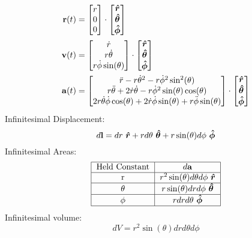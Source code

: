     \begin{align*}
        \vb{r}(t)&=
        \begin{bmatrix}
        r
        \\
        0
        \\
        0
        \end{bmatrix}
        \cdot
        \begin{bmatrix}
        \e{r}
        \\
        \e{\theta}
        \\
        \e{\phi}
        \end{bmatrix}
        \\
        \vb{v}(t)&=
        \begin{bmatrix}
        \dot{r}
        \\
        r\dot{\theta}
        \\
        r\dot{\phi}\sin(\theta)
        \end{bmatrix}
        \cdot
        \begin{bmatrix}
        \e{r}
        \\
        \e{\theta}
        \\
        \e{\phi}
        \end{bmatrix}
        \\
        \vb{a}(t)&=
        \begin{bmatrix}
        \Ddot{r}-r\dot{\theta}^2-r\dot{\phi}^2\sin^2(\theta)
        \\
        r\Ddot{\theta}+2\dot{r}\dot{\theta}-r\dot{\phi}^2\sin(\theta)\cos(\theta)
        \\
        2r\dot{\theta}\dot{\phi}\cos(\theta)+2\dot{r}\dot{\phi}\sin(\theta)+r\Ddot{\phi}\sin(\theta)
        \end{bmatrix}
        \cdot
        \begin{bmatrix}
        \e{r}\\
        \e{\theta}\\
        \e{\phi}
        \end{bmatrix}
    \end{align*}
    \newpage\noindent
    Infinitesimal Displacement:
    \[\dl* = dr\ \e{r} + r d\theta\ \e{\theta} + r \sin(\theta) d\phi\ \e{\phi} \]
    Infinitesimal Areas:
    \begin{align*}
    \begin{tabular}{|c|c|}
        \hline
        Held Constant & $\da*$ \\ 
        \hline
        r & $r^2 \sin(\theta) d\theta d\phi\ \e{r}$\\ 
        \hline
        $\theta$ & $r \sin(\theta) dr d\phi\ \e{\theta}$ \\ 
        \hline
        $\phi$ & $r dr d\theta\ \e{\phi}$\\
        \hline
    \end{tabular}
    \end{align*}
    Infinitesimal volume: \[dV = r^2\sin(\theta) dr d\theta d\phi\]
